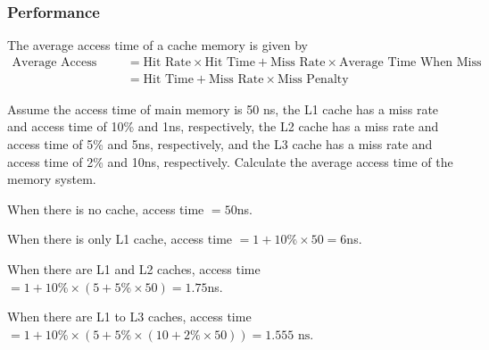 \subsubsection{Performance}

\begin{definition}
    The average access time of a cache memory is given by
    \begin{align*}
        \text{Average Access Time}
        &= \text{Hit Rate} \times \text{Hit Time} + \text{Miss Rate} \times \text{Average Time When Miss} \\
        &= \text{Hit Time} + \text{Miss Rate} \times \text{Miss Penalty}
    \end{align*}
\end{definition}

\begin{example}
    Assume the access time of main memory is 50 ns, the L1 cache has a miss rate and access
    time of 10\% and 1ns, respectively, the L2 cache has a miss rate and access time
    of 5\% and 5ns, respectively, and the L3 cache has a miss rate and access time of 2\%
    and 10ns, respectively. Calculate the average access time of the memory system.

    \begin{solution}
        When there is no cache, access time $=50$ns.

        When there is only L1 cache, access time $=1+10\%\times 50=6$ns.

        When there are L1 and L2 caches, access time $=1+10\%\times(5+5\%\times 50)=1.75$ns.

        When there are L1 to L3 caches, access time $=1+10\%\times(5+5\%\times(10+2\%\times 50))=\boxed{1.555\text{ ns}}$.
    \end{solution}
\end{example}


